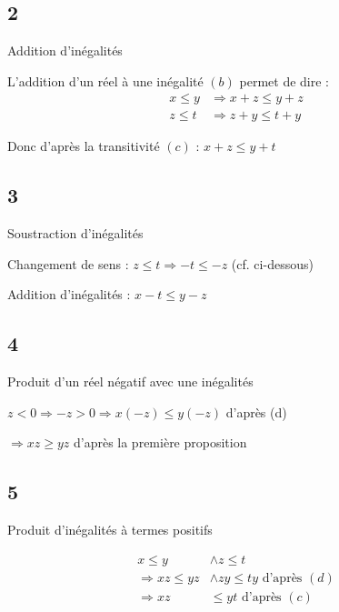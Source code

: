 \documentclass[12pt]{smfbook}
\begin{document}
\subsection*{2} Addition d'inégalités

L'addition d'un réel à une inégalité $(b)$ permet de dire :
\begin{displaymath}
	\begin{split}
x \leq y & \Rightarrow x  + z\leq y + z \\
z \leq t & \Rightarrow z + y \leq t + y
	\end{split}
\end{displaymath}

Donc d'après la transitivité $(c)$  : $ x  + z \leq y + t$ 

\subsection*{3} Soustraction d'inégalités
 
Changement de sens : $z \leq t \Rightarrow -t \leq -z$ (cf. ci-dessous)

Addition d'inégalités : $x - t \leq y - z$ 

\subsection*{4} Produit d'un réel négatif avec une inégalités

$ z < 0 \Rightarrow -z > 0 \Rightarrow x(-z) \leq y(-z)$ d'après (d)

$ \Rightarrow xz \geq yz$ d'après la première proposition

\subsection*{5} Produit d'inégalités à termes positifs

\begin{displaymath}
	\begin{split}
	x \leq y  &\wedge z\leq t\\
	\Rightarrow xz \leq yz &\wedge zy \leq ty \text{ d'après $(d)$} \\
	\Rightarrow xz &\leq yt \text{ d'après $(c)$}
	\end{split}
\end{displaymath}
\end{document}
